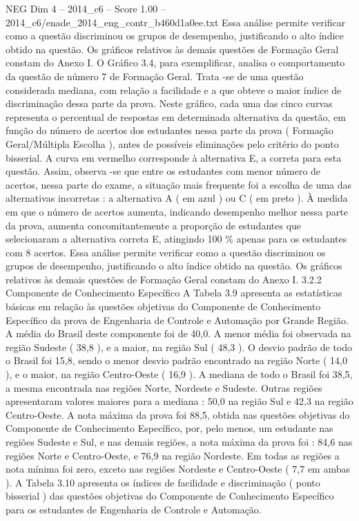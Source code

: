 \begin{textsample}{NEG Dim 4 – 2014\_c6 – Score 1.00 – 2014\_c6/enade\_2014\_eng\_contr\_b460d1a0ee.txt}
Essa análise permite verificar como a questão discriminou os grupos de desempenho, justificando o alto índice obtido na questão.
Os gráficos relativos às demais questões de Formação Geral constam do Anexo I.
O Gráfico 3.4, para exemplificar, analisa o comportamento da questão de número 7 de Formação Geral.
Trata -se de uma questão considerada mediana, com relação a facilidade e a que obteve o maior índice de discriminação dessa parte da prova.
Neste gráfico, cada uma das cinco curvas representa o percentual de respostas em determinada alternativa da questão, em função do número de acertos dos estudantes nessa parte da prova ( Formação Geral/Múltipla Escolha ), antes de possíveis eliminações pelo critério do ponto bisserial.
A curva em vermelho corresponde à alternativa E, a correta para esta questão.
Assim, observa -se que entre os estudantes com menor número de acertos, nessa parte do exame, a situação mais frequente foi a escolha de uma das alternativas incorretas : a alternativa A ( em azul ) ou C ( em preto ).
À medida em que o número de acertos aumenta, indicando desempenho melhor nessa parte da prova, aumenta concomitantemente a proporção de estudantes que selecionaram a alternativa correta E, atingindo 100 \% apenas para os estudantes com 8 acertos.
Essa análise permite verificar como a questão discriminou os grupos de desempenho, justificando o alto índice obtido na questão.
Os gráficos relativos às demais questões de Formação Geral constam do Anexo I. 3.2.2 Componente de Conhecimento Específico A Tabela 3.9 apresenta as estatísticas básicas em relação às questões objetivas do Componente de Conhecimento Específico da prova de Engenharia de Controle e Automação por Grande Região.
A média do Brasil deste componente foi de 40,0.
A menor média foi observada na região Sudeste ( 38,8 ), e a maior, na região Sul ( 48,3 ).
O desvio padrão de todo o Brasil foi 15,8, sendo o menor desvio padrão encontrado na região Norte ( 14,0 ), e o maior, na região Centro-Oeste ( 16,9 ).
A mediana de todo o Brasil foi 38,5, a mesma encontrada nas regiões Norte, Nordeste e Sudeste.
Outras regiões apresentaram valores maiores para a mediana : 50,0 na região Sul e 42,3 na região Centro-Oeste.
A nota máxima da prova foi 88,5, obtida nas questões objetivas do Componente de Conhecimento Específico, por, pelo menos, um estudante nas regiões Sudeste e Sul, e nas demais regiões, a nota máxima da prova foi : 84,6 nas regiões Norte e Centro-Oeste, e 76,9 na região Nordeste.
Em todas as regiões a nota mínima foi zero, exceto nas regiões Nordeste e Centro-Oeste ( 7,7 em ambas ).
A Tabela 3.10 apresenta os índices de facilidade e discriminação ( ponto bisserial ) das questões objetivas do Componente de Conhecimento Específico para os estudantes de Engenharia de Controle e Automação.

\end{textsample}
